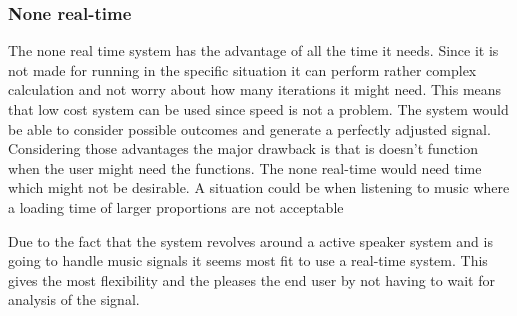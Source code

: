\subsubsection*{None real-time}
The none real time system has the advantage of all the time it needs. Since it is not made for running in the specific situation it can perform rather complex calculation and not worry about how many iterations it might need. This means that low cost system can be used since speed is not a problem. The system would be able to consider possible outcomes and generate a perfectly adjusted signal. Considering those advantages the major drawback is that is doesn't function when the user might need the functions. The none real-time would need time which might not be desirable. A situation could be when listening to music where a loading time of larger proportions are not acceptable 


Due to the fact that the system revolves around a active speaker system and is going to handle music signals it seems most fit to use a real-time system. This gives the most flexibility and the pleases the end user by not having to wait for analysis of the signal.










